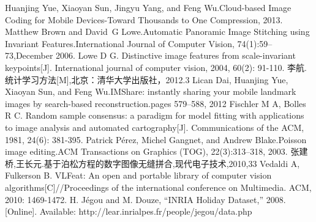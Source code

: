 \documentclass[UTF8]{csoarticle}
\begin{document}
\begin{thebibliography}{10} %
     Huanjing Yue, Xiaoyan Sun, Jingyu Yang, and Feng Wu.Cloud-based Image Coding for Mobile Devices-Toward Thousands to One Compression, 2013.
     Matthew Brown and David~G Lowe.Automatic Panoramic Image Stitching using Invariant Features.International Journal of Computer Vision, 74(1):59--73,December 2006.
     Lowe D G. Distinctive image features from scale-invariant keypoints[J]. International journal of computer vision, 2004, 60(2): 91-110.
     李航.统计学习方法[M],北京：清华大学出版社，2012.3
     Lican Dai, Huanjing Yue, Xiaoyan Sun, and Feng Wu.IMShare: instantly sharing your mobile landmark images by search-based reconstruction.pages 579--588, 2012
     Fischler M A, Bolles R C. Random sample consensus: a paradigm for model fitting with applications to image analysis and automated cartography[J]. Communications of the ACM, 1981, 24(6): 381-395.
     Patrick P{\'e}rez, Michel Gangnet, and Andrew Blake.Poisson image editing.ACM Transactions on Graphics (TOG), 22(3):313--318, 2003.
     张建桥,王长元.基于泊松方程的数字图像无缝拼合,现代电子技术,2010,33
     Vedaldi A, Fulkerson B. VLFeat: An open and portable library of computer vision algorithms[C]//Proceedings of the international conference on Multimedia. ACM, 2010: 1469-1472.
     H. Jégou and M. Douze, “INRIA Holiday Dataset,” 2008. [Online]. Available: http://lear.inrialpes.fr/people/jegou/data.php
\end{thebibliography}
\end{document}

